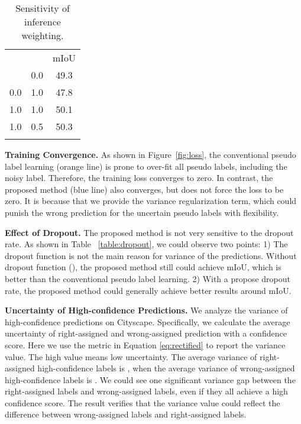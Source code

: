 \setlength{\tabcolsep}{15pt}
\begin{table}
\small
\begin{center}
\begin{tabular}{l|c|c}
\shline
 &  & mIoU\\
\shline
1.0 & 0.0 & 49.3 \\
0.0 & 1.0 & 47.8 \\
1.0 & 1.0 & 50.1 \\
\hline
1.0 & 0.5 & 50.3 \\
\shline
\end{tabular}
\end{center}
\caption{Sensitivity of inference weighting.}
\label{table:inference}
\end{table}

\noindent\textbf{Training Convergence.} 
As shown in Figure~\ref{fig:loss}, the conventional pseudo label learning (orange line) is prone to over-fit all pseudo labels, including the noisy label. Therefore, the training loss converges to zero. In contrast, the proposed method (blue line) also converges, but does not force the loss to be zero. It is because that we provide the variance regularization term, which could punish the wrong prediction for the uncertain pseudo labels with flexibility. 

\noindent\textbf{Effect of Dropout.} 
The proposed method is not very sensitive to the dropout rate. As shown in Table ~\ref{table:dropout}, we could observe two points: 1) The dropout function is not the main reason for variance of the predictions. Without dropout function (), the proposed method still could achieve  mIoU, which is better than the conventional pseudo label learning. 2) With a propose dropout rate, the proposed method could generally achieve  better results around  mIoU.

\noindent\textbf{Uncertainty of High-confidence Predictions.} 
We analyze the variance of high-confidence predictions on Cityscape. Specifically, we calculate the average uncertainty of right-assigned and wrong-assigned prediction with a confidence score. Here we use the metric  in Equation \ref{eq:rectified} to report the variance value. The high value means low uncertainty. 
The average variance of right-assigned high-confidence labels is , when the average variance of wrong-assigned high-confidence labels is . We could see one significant variance gap between the right-assigned labels and wrong-assigned labels, even if they all achieve a high confidence score. The result verifies that the variance value could reflect the difference between wrong-assigned labels and right-assigned labels. 



